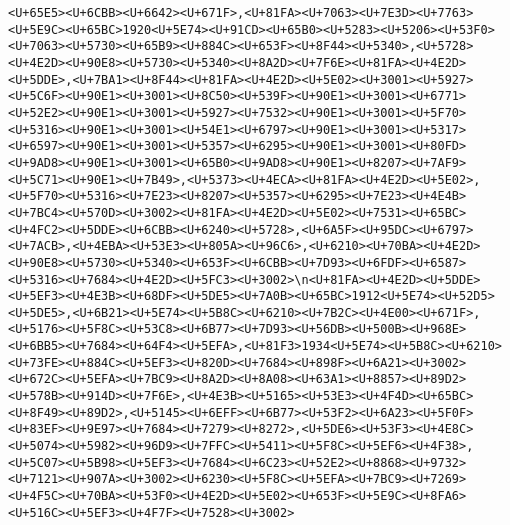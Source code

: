 \documentclass[
]{article}
\begin{document}
\begin{verbatim}
<U+65E5><U+6CBB><U+6642><U+671F>,<U+81FA><U+7063><U+7E3D><U+7763><U+5E9C><U+65BC>1920<U+5E74><U+91CD><U+65B0><U+5283><U+5206><U+53F0><U+7063><U+5730><U+65B9><U+884C><U+653F><U+8F44><U+5340>,<U+5728><U+4E2D><U+90E8><U+5730><U+5340><U+8A2D><U+7F6E><U+81FA><U+4E2D><U+5DDE>,<U+7BA1><U+8F44><U+81FA><U+4E2D><U+5E02><U+3001><U+5927><U+5C6F><U+90E1><U+3001><U+8C50><U+539F><U+90E1><U+3001><U+6771><U+52E2><U+90E1><U+3001><U+5927><U+7532><U+90E1><U+3001><U+5F70><U+5316><U+90E1><U+3001><U+54E1><U+6797><U+90E1><U+3001><U+5317><U+6597><U+90E1><U+3001><U+5357><U+6295><U+90E1><U+3001><U+80FD><U+9AD8><U+90E1><U+3001><U+65B0><U+9AD8><U+90E1><U+8207><U+7AF9><U+5C71><U+90E1><U+7B49>,<U+5373><U+4ECA><U+81FA><U+4E2D><U+5E02>,<U+5F70><U+5316><U+7E23><U+8207><U+5357><U+6295><U+7E23><U+4E4B><U+7BC4><U+570D><U+3002><U+81FA><U+4E2D><U+5E02><U+7531><U+65BC><U+4FC2><U+5DDE><U+6CBB><U+6240><U+5728>,<U+6A5F><U+95DC><U+6797><U+7ACB>,<U+4EBA><U+53E3><U+805A><U+96C6>,<U+6210><U+70BA><U+4E2D><U+90E8><U+5730><U+5340><U+653F><U+6CBB><U+7D93><U+6FDF><U+6587><U+5316><U+7684><U+4E2D><U+5FC3><U+3002>\n<U+81FA><U+4E2D><U+5DDE><U+5EF3><U+4E3B><U+68DF><U+5DE5><U+7A0B><U+65BC>1912<U+5E74><U+52D5><U+5DE5>,<U+6B21><U+5E74><U+5B8C><U+6210><U+7B2C><U+4E00><U+671F>,<U+5176><U+5F8C><U+53C8><U+6B77><U+7D93><U+56DB><U+500B><U+968E><U+6BB5><U+7684><U+64F4><U+5EFA>,<U+81F3>1934<U+5E74><U+5B8C><U+6210><U+73FE><U+884C><U+5EF3><U+820D><U+7684><U+898F><U+6A21><U+3002><U+672C><U+5EFA><U+7BC9><U+8A2D><U+8A08><U+63A1><U+8857><U+89D2><U+578B><U+914D><U+7F6E>,<U+4E3B><U+5165><U+53E3><U+4F4D><U+65BC><U+8F49><U+89D2>,<U+5145><U+6EFF><U+6B77><U+53F2><U+6A23><U+5F0F><U+83EF><U+9E97><U+7684><U+7279><U+8272>,<U+5DE6><U+53F3><U+4E8C><U+5074><U+5982><U+96D9><U+7FFC><U+5411><U+5F8C><U+5EF6><U+4F38>,<U+5C07><U+5B98><U+5EF3><U+7684><U+6C23><U+52E2><U+8868><U+9732><U+7121><U+907A><U+3002><U+6230><U+5F8C><U+5EFA><U+7BC9><U+7269><U+4F5C><U+70BA><U+53F0><U+4E2D><U+5E02><U+653F><U+5E9C><U+8FA6><U+516C><U+5EF3><U+4F7F><U+7528><U+3002>

\end{verbatim}
\end{document}
